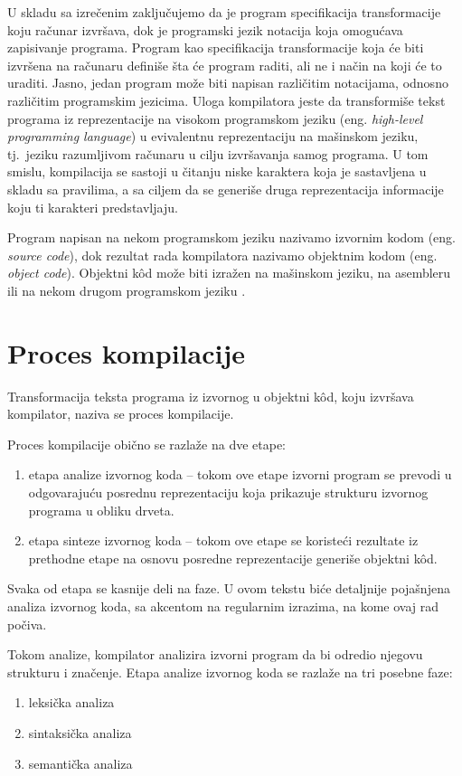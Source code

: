 \documentclass[12pt,oneside]{memoir}
\theoremstyle{plain}
\theoremstyle{definition}
\begin{document}
U skladu sa izrečenim zaključujemo da je program specifikacija transformacije koju računar izvršava, dok je programski jezik notacija koja omogućava zapisivanje programa. Program kao specifikacija transformacije koja će biti izvršena na računaru definiše šta će program raditi, ali ne i način na koji će to uraditi. Jasno, jedan program može biti napisan različitim notacijama, odnosno različitim programskim jezicima. Uloga kompilatora jeste da transformiše tekst programa iz reprezentacije na visokom programskom jeziku (eng. \textit{high-level programming language}) u evivalentnu reprezentaciju na mašinskom jeziku, tj.~jeziku razumljivom računaru u cilju izvršavanja samog programa. U tom smislu, kompilacija se sastoji u čitanju niske karaktera koja je sastavljena u skladu sa pravilima, a sa ciljem da se generiše druga reprezentacija informacije koju ti karakteri predstavljaju.

Program napisan na nekom programskom jeziku nazivamo izvornim kodom  (eng. \textit{source code}), dok rezultat rada kompilatora nazivamo objektnim kodom (eng. \textit{object code}). Objektni k\^od može biti izražen na mašinskom jeziku, na asembleru ili na nekom drugom programskom jeziku \cite{Vitas}. 

\section{Proces kompilacije}
Transformacija teksta programa iz izvornog u objektni k\^od, koju izvršava kompilator, naziva se proces kompilacije.

Proces kompilacije obično se razlaže na dve etape:
\begin{enumerate}
\item etapa analize izvornog koda – tokom ove etape izvorni program se prevodi u odgovarajuću posrednu reprezentaciju koja prikazuje strukturu izvornog programa u obliku drveta.
\item etapa sinteze izvornog koda – tokom ove etape se koristeći rezultate iz prethodne etape na osnovu posredne reprezentacije generiše objektni k\^od.
\end{enumerate}
Svaka od etapa se kasnije deli na faze. U ovom tekstu biće detaljnije pojašnjena analiza izvornog koda, sa akcentom na regularnim izrazima, na kome ovaj rad počiva.

Tokom analize, kompilator analizira izvorni program da bi odredio njegovu strukturu i značenje. Etapa analize izvornog koda se razlaže na tri posebne faze:
\begin{enumerate}
\item leksička analiza
\item sintaksička analiza
\item semantička analiza
\end{enumerate}
\end{document}
